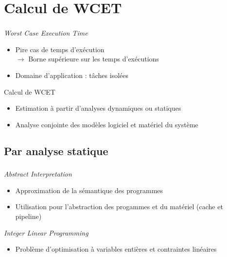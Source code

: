 \documentclass{beamer}
\begin{document}
  \section{Calcul de WCET}
  \begin{frame}
    \frametitle{\secname}

    \begin{block}{\textit{Worst Case Execution Time}}
      \begin{itemize}
        \item \og Pire cas de temps d'exécution \fg \\
          $\rightarrow$ Borne supérieure sur les temps d'exécutions
        \item Domaine d'application : tâches isolées
      \end{itemize}
    \end{block}

    
    \begin{block}{Calcul de WCET}
      \begin{itemize}
        \item Estimation à partir d'analyses dynamiques ou statiques
        \item Analyse conjointe des modèles logiciel et matériel du système
      \end{itemize}
    \end{block}
  \end{frame}
  
  \subsection{Par analyse statique}
  \begin{frame}
    \frametitle{\secname}
    \framesubtitle{\subsecname}

    \begin{block}{\textit{Abstract Interpretation}}
      \begin{itemize}
        \item Approximation de la sémantique des programmes
        \item Utilisation pour l'abstraction des progammes et du matériel (cache et pipeline)
      \end{itemize}
    \end{block}


    \begin{block}{\textit{Integer Linear Programming}}
      \begin{itemize}
        \item Problème d'optimisation à variables entières et contraintes linéaires
      \end{itemize}
    \end{block}
  \end{frame}
\end{document}
